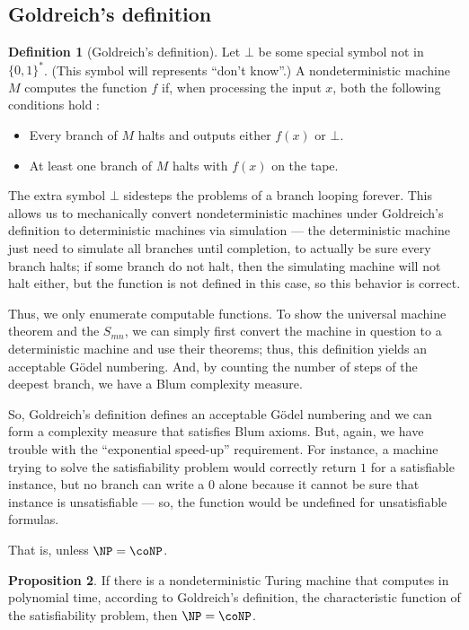 \documentclass[12pt]{article}
\theoremstyle{definition}
\newtheorem{definition}{Definition}
\newtheorem{proposition}[definition]{Proposition}
\begin{document}
\subsection{Goldreich's definition}
\label{sec:goldreich}

\begin{definition}[Goldreich's definition]
    Let $\bot$ be some special symbol not in $\{0, 1\}^*$.
    (This symbol will represents ``don't know''.)
    A nondeterministic machine $M$ computes the function $f$ if,
    when processing the input $x$,
    both the following conditions hold \cite[p.~168]{Goldreich2008}:
    \begin{itemize}
        \item Every branch of $M$ halts
            and outputs either $f(x)$ or $\bot$.
        \item At least one branch of $M$ halts with $f(x)$ on the tape.
    \end{itemize}
\end{definition}
The extra symbol $\bot$ sidesteps the problems of a branch looping forever.
This allows us to mechanically convert nondeterministic machines
under Goldreich's definition
to deterministic machines via simulation
--- the deterministic machine just need to simulate all branches until completion,
to actually be sure every branch halts;
if some branch do not halt,
then the simulating machine will not halt either,
but the function is not defined in this case,
so this behavior is correct.

Thus, we only enumerate computable functions.
To show the universal machine theorem and the $S_{mn}$,
we can simply first convert the machine in question to a deterministic machine
and use their theorems;
thus, this definition yields an acceptable Gödel numbering.
And, by counting the number of steps of the deepest branch,
we have a Blum complexity measure.

So, Goldreich's definition defines an acceptable Gödel numbering
and we can form a complexity measure that satisfies Blum axioms.
But, again,
we have trouble with the ``exponential speed-up'' requirement.
For instance,
a machine trying to solve the satisfiability problem
would correctly return $1$ for a satisfiable instance,
but no branch can write a $0$ alone
because it cannot be sure that instance is unsatisfiable
--- so, the function would be undefined for unsatisfiable formulas.

That is, unless $\NP = \coNP$.

\begin{proposition}
    If there is a nondeterministic Turing machine
    that computes in polynomial time, according to Goldreich's definition,
    the characteristic function of the satisfiability problem,
    then $\NP = \coNP$.
\end{proposition}
\end{document}
